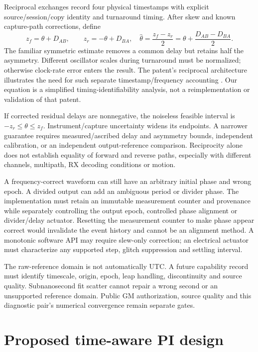 \documentclass[11pt,letterpaper]{article}
\begin{document}
Reciprocal exchanges record four physical timestamps with explicit source/session/copy identity and turnaround timing. After skew and known capture-path corrections, define
\begin{equation}
 z_f=\theta+D_{AB},\qquad z_r=-\theta+D_{BA},\quad
 \widehat\theta=\frac{z_f-z_r}{2}=\theta+\frac{D_{AB}-D_{BA}}{2}.\label{eq:twoway}
\end{equation}
The familiar symmetric estimate removes a common delay but retains half the asymmetry. Different oscillator scales during turnaround must be normalized; otherwise clock-rate error enters the result. The patent's reciprocal architecture illustrates the need for such separate timestamp/frequency accounting \cite{patent}. Our equation is a simplified timing-identifiability analysis, not a reimplementation or validation of that patent.

If corrected residual delays are nonnegative, the noiseless feasible interval is $-z_r\le\theta\le z_f$. Instrument/capture uncertainty widens its endpoints. A narrower guarantee requires measured/ascribed delay and asymmetry bounds, independent calibration, or an independent output-reference comparison. Reciprocity alone does not establish equality of forward and reverse paths, especially with different channels, multipath, RX decoding conditions or motion.

A frequency-correct waveform can still have an arbitrary initial phase and wrong epoch. A divided output can add an ambiguous period or divider phase. The implementation must retain an immutable measurement counter and provenance while separately controlling the output epoch, controlled phase alignment or divider/delay actuator. Resetting the measurement counter to make phase appear correct would invalidate the event history and cannot be an alignment method. A monotonic software API may require slew-only correction; an electrical actuator must characterize any supported step, glitch suppression and settling interval.

The raw-reference domain is not automatically UTC. A future capability record must identify timescale, origin, epoch, leap handling, discontinuity and source quality. Subnanosecond fit scatter cannot repair a wrong second or an unsupported reference domain. Public GM authorization, source quality and this diagnostic pair's numerical convergence remain separate gates.

\section{Proposed time-aware PI design}
\end{document}
